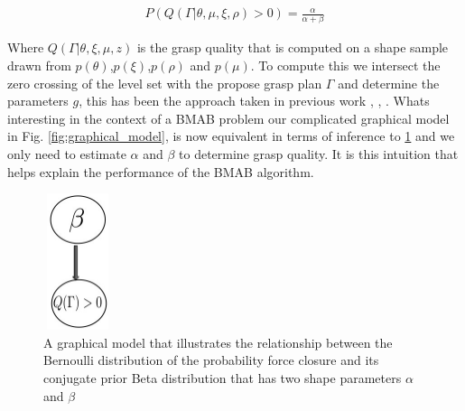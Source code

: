 \documentclass[journal,transmag]{IEEEtran}%
\begin{document}
\vspace{-2ex}
\begin{align}\label{eq:shape_sampling}
P(Q(\Gamma|\theta,\mu,\xi,\rho) > 0) = \frac{\alpha}{\alpha + \beta}
\end{align}

Where $Q(\Gamma|\theta,\xi,\mu,z)$ is the grasp quality that is computed on a shape sample drawn from $p(\theta)$,$p(\xi)$,$p(\rho)$ and $p(\mu)$. To compute this we intersect the zero crossing of the level set with the propose grasp plan $\Gamma$ and determine the parameters $g$, this has been the approach taken in previous work  \cite{kehoe2012estimating}, \cite{kehoe2012toward},  \cite{christopoulos2007handling}. Whats interesting in the context of a BMAB problem our complicated graphical model in Fig. \ref{fig:graphical_model}, is now equivalent in terms of inference to \ref{fig:beta_model} and we only need to estimate $\alpha$ and $\beta$ to determine grasp quality. It is this intuition that helps explain the performance of the BMAB algorithm. 

\begin{figure}[ht!]
\centering
\includegraphics[width = 2cm, height = 4cm]{figures/Slide9.jpg}
\caption{A graphical model that illustrates the relationship between the Bernoulli distribution of the probability force closure and its conjugate prior Beta distribution that has two shape parameters $\alpha$ and $\beta$ }
\vspace*{-10pt}
\label{fig:beta_model}
\end{figure}
\end{document}
